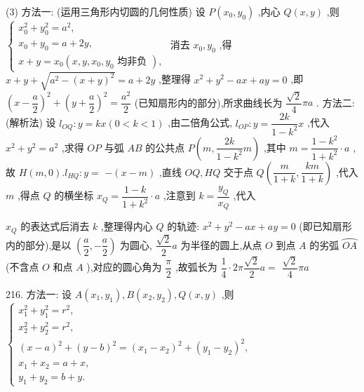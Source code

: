 (3) 方法一: (运用三角形内切圆的几何性质) 设 $P\left( {{x}_{0},{y}_{0}}\right)$ ,内心 $Q\left( {x,y}\right)$ ,则 $\left\{  \begin{array}{l} {x}_{0}^{2} + {y}_{0}^{2} = {a}^{2}, \\  {x}_{0} + {y}_{0} = a + {2y}, \\  x + y = {x}_{0}\left( {x,y,{x}_{0},{y}_{0}\text{ 均非负 }}\right) , \end{array}\right.$ 消去 ${x}_{0},{y}_{0}$ ,得 $x + y + \sqrt{{a}^{2} - {\left( x + y\right) }^{2}} = a + {2y}$ ,整理得 ${x}^{2} + {y}^{2} - {ax} + {ay} = 0$ ,即 ${\left( x - \dfrac{a}{2}\right) }^{2} + {\left( y + \dfrac{a}{2}\right) }^{2} = \dfrac{{a}^{2}}{2}$ (已知扇形内的部分),所求曲线长为 $\dfrac{\sqrt{2}}{4}{\pi a}$ . 方法二: (解析法) 设 ${l}_{OQ} : y = {kx}\left( {0 < k < 1}\right)$ ,由二倍角公式, ${l}_{OP} : y = \dfrac{2k}{1 - {k}^{2}}x$ ,代入 ${x}^{2} + {y}^{2} = {a}^{2}$ ,求得 ${OP}$ 与弧 ${AB}$ 的公共点 $P\left( {m,\dfrac{2k}{1 - {k}^{2}}m}\right)$ ,其中 $m = \dfrac{1 - {k}^{2}}{1 + {k}^{2}} \cdot  a$ ,故 $H\left( {m,0}\right) .{l}_{HQ} : y =$  $- \left( {x - m}\right)$ ,直线 ${OQ},{HQ}$ 交于点 $Q\left( {\dfrac{m}{1 + k},\dfrac{km}{1 + k}}\right)$ ,代入 $m$ ,得点 $Q$ 的横坐标 ${x}_{Q} = \dfrac{1 - k}{1 + {k}^{2}} \cdot  a$ ,注意到 $k = \dfrac{{y}_{Q}}{{x}_{Q}}$ ,代入

${x}_{Q}$ 的表达式后消去 $k$ ,整理得内心 $Q$ 的轨迹: ${x}^{2} + {y}^{2} - {ax} + {ay} = 0$ (即已知扇形内的部分),是以 $\left( {\dfrac{a}{2}, - \dfrac{a}{2}}\right)$ 为圆心, $\dfrac{\sqrt{2}}{2}a$ 为半径的圆上,从点 $O$ 到点 $A$ 的劣弧 $\overset{⏜}{OA}$ (不含点 $O$ 和点 $A$ ),对应的圆心角为 $\dfrac{\pi }{2}$ ,故弧长为 $\dfrac{1}{4} \cdot  {2\pi }\dfrac{\sqrt{2}}{2}a =$  $\dfrac{\sqrt{2}}{4}{\pi a}$

216. 方法一: 设 $A\left( {{x}_{1},{y}_{1}}\right) ,B\left( {{x}_{2},{y}_{2}}\right) ,Q\left( {x,y}\right)$ ,则 $\left\{  \begin{array}{l} {x}_{1}^{2} + {y}_{1}^{2} = {r}^{2}, \\  {x}_{2}^{2} + {y}_{2}^{2} = {r}^{2}, \\  {\left( x - a\right) }^{2} + {\left( y - b\right) }^{2} = {\left( {x}_{1} - {x}_{2}\right) }^{2} + {\left( {y}_{1} - {y}_{2}\right) }^{2}, \\  {x}_{1} + {x}_{2} = a + x, \\  {y}_{1} + {y}_{2} = b + y. \end{array}\right.$

